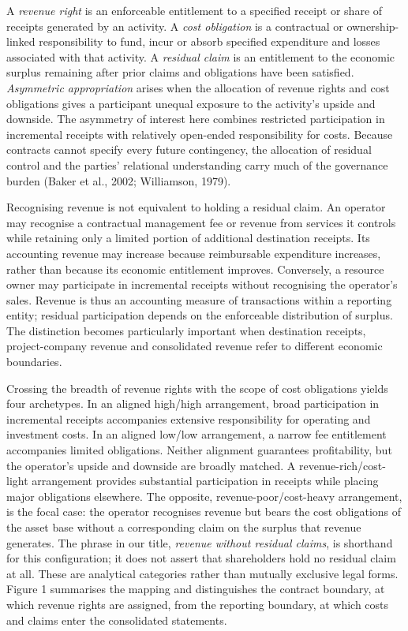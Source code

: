 \documentclass[review,3p,times]{elsarticle}
\begin{document}
A \emph{revenue right} is an enforceable entitlement to a specified receipt or share of receipts generated by an activity. A \emph{cost obligation} is a contractual or ownership-linked responsibility to fund, incur or absorb specified expenditure and losses associated with that activity. A \emph{residual claim} is an entitlement to the economic surplus remaining after prior claims and obligations have been satisfied. \emph{Asymmetric appropriation} arises when the allocation of revenue rights and cost obligations gives a participant unequal exposure to the activity's upside and downside. The asymmetry of interest here combines restricted participation in incremental receipts with relatively open-ended responsibility for costs. Because contracts cannot specify every future contingency, the allocation of residual control and the parties' relational understanding carry much of the governance burden (Baker et al., 2002; Williamson, 1979).

Recognising revenue is not equivalent to holding a residual claim. An operator may recognise a contractual management fee or revenue from services it controls while retaining only a limited portion of additional destination receipts. Its accounting revenue may increase because reimbursable expenditure increases, rather than because its economic entitlement improves. Conversely, a resource owner may participate in incremental receipts without recognising the operator's sales. Revenue is thus an accounting measure of transactions within a reporting entity; residual participation depends on the enforceable distribution of surplus. The distinction becomes particularly important when destination receipts, project-company revenue and consolidated revenue refer to different economic boundaries.

Crossing the breadth of revenue rights with the scope of cost obligations yields four archetypes. In an aligned high/high arrangement, broad participation in incremental receipts accompanies extensive responsibility for operating and investment costs. In an aligned low/low arrangement, a narrow fee entitlement accompanies limited obligations. Neither alignment guarantees profitability, but the operator's upside and downside are broadly matched. A revenue-rich/cost-light arrangement provides substantial participation in receipts while placing major obligations elsewhere. The opposite, revenue-poor/cost-heavy arrangement, is the focal case: the operator recognises revenue but bears the cost obligations of the asset base without a corresponding claim on the surplus that revenue generates. The phrase in our title, \emph{revenue without residual claims}, is shorthand for this configuration; it does not assert that shareholders hold no residual claim at all. These are analytical categories rather than mutually exclusive legal forms. Figure 1 summarises the mapping and distinguishes the contract boundary, at which revenue rights are assigned, from the reporting boundary, at which costs and claims enter the consolidated statements.
\end{document}
